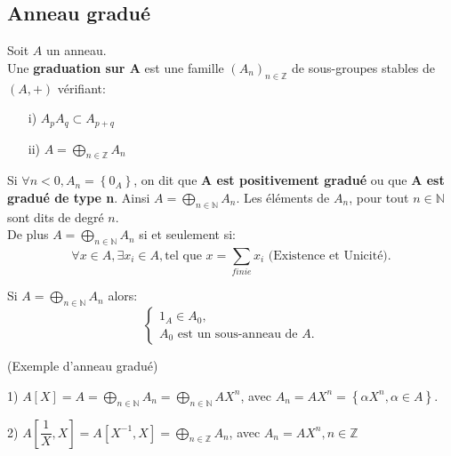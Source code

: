 \subsection{Anneau gradué}
\begin{madefinition}
	Soit $A$ un anneau.\\
	Une \textbf{graduation sur A} est une famille $(A_n)_{n \in \mathbb{Z}}$ de  sous-groupes stables de $(A,+)$ vérifiant:
	\begin{enumerate}
		\item[i)] $ A_p A_q \subset A_{p+q} $
		\item[ii)] $ A =\displaystyle \bigoplus_{n \in \mathbb{Z}}{A_n} $
	\end{enumerate}
	Si $\forall n < 0, A_n = \left\{0_A\right\}$, on dit que \textbf{A est positivement gradué} ou que \textbf{A est gradué de type n}. Ainsi $ A =\displaystyle \bigoplus_{n \in \mathbb{N}}{A_n} $. Les éléments de $A_n$, pour tout $n \in \mathbb{N} $ sont dits de degré $n$.\\
	De plus $ A =\displaystyle \bigoplus_{n \in \mathbb{N}}{A_n} $ si et seulement si:
	\[ \forall x \in A, \exists x_i \in A, \text{tel que } x = \sum_{finie}^{} x_i \text{ (Existence et Unicité)}. \]
\end{madefinition} 
\begin{maremarque}
Si $ A =\displaystyle \bigoplus_{n \in \mathbb{N}}{A_n} $ alors:
$$  
\begin{cases}
	1_A \in A_0,\\
	A_0 \text{ est un sous-anneau de }A. 
\end{cases}
$$
\newline
\begin{monexemple}
	(Exemple d'anneau gradué)\\
	\item[1)] $A[X] =  A =\displaystyle \bigoplus_{n \in \mathbb{N}}{A_n} =\displaystyle \bigoplus_{n \in \mathbb{N}}{A}X^n $,
	avec $A_n=AX^n = \left\{\alpha X^n, \alpha \in A \right\}$.
	\item[2)] $A[\dfrac{1}{X}, X] = A[X^{-1}, X] = \displaystyle \bigoplus_{n \in \mathbb{Z}}{A_n}$, avec $A_n=AX^n, n \in \mathbb{Z}$
\end{monexemple}
\end{maremarque}
